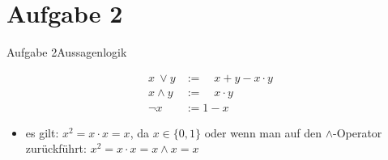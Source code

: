 
\section{Aufgabe 2}

\setcounter{task}{1}

\begin{frame}[allowframebreaks]{Aufgabe 2}{Aussagenlogik}
\begin{requirementsnoinc}
  \begin{align}
    x\ \vee y &:=\quad x+y-x\cdot y\\
    x\wedge y &:=\quad x\cdot y\\
    {\neg x}  &:={1-x}
  \end{align}
  \begin{itemize}
    \item \alert{es gilt:} $x^{2}=x\cdot x=x$, da $x\in\{0,1\}$ oder wenn man auf den $\wedge$-Operator zurückführt: $x^{2}=x\cdot x=x\wedge x=x$
  \end{itemize}
\end{requirementsnoinc}



\end{frame}

